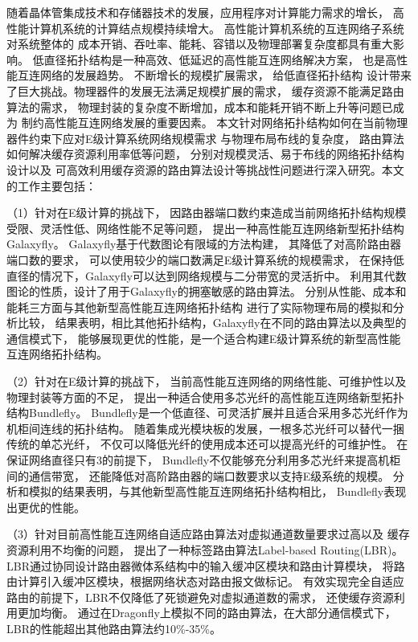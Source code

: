 \begin{cabstract}
  随着晶体管集成技术和存储器技术的发展，应用程序对计算能力需求的增长，
  高性能计算机系统的计算结点规模持续增大。
  高性能计算机系统的互连网络子系统对系统整体的
  成本开销、吞吐率、能耗、容错以及物理部署复杂度都具有重大影响。
  低直径拓扑结构是一种高效、低延迟的高性能互连网络解决方案，
  也是高性能互连网络的发展趋势。
  不断增长的规模扩展需求，
  给低直径拓扑结构
  设计带来了巨大挑战。物理器件的发展无法满足规模扩展的需求，
  缓存资源不能满足路由算法的需求，
  物理封装的复杂度不断增加，成本和能耗开销不断上升等问题已成为
  制约高性能互连网络发展的重要因素。
  本文针对网络拓扑结构如何在当前物理器件约束下应对E级计算系统网络规模需求
  与物理布局布线的复杂度，
  路由算法如何解决缓存资源利用率低等问题，
  分别对规模灵活、易于布线的网络拓扑结构设计以及
  可高效利用缓存资源的路由算法设计等挑战性问题进行深入研究。本文的工作主要包括：

  （1）针对在E级计算的挑战下，
  因路由器端口数约束造成当前网络拓扑结构规模受限、灵活性低、网络性能不足等问题，
  提出一种高性能互连网络新型拓扑结构Galaxyfly。
  Galaxyfly基于代数图论有限域的方法构建，
  其降低了对高阶路由器端口数的要求，
  可以使用较少的端口数满足E级计算系统的规模需求，
  在保持低直径的情况下，Galaxyfly可以达到网络规模与二分带宽的灵活折中。
  利用其代数图论的性质，设计了用于Galaxyfly的拥塞敏感的路由算法。
  分别从性能、成本和能耗三方面与其他新型高性能互连网络拓扑结构
  进行了实际物理布局的模拟和分析比较，
  结果表明，相比其他拓扑结构，Galaxyfly在不同的路由算法以及典型的通信模式下，
  能够展现更优的性能，是一个适合构建E级计算系统的新型高性能互连网络拓扑结构。

  （2）针对在E级计算的挑战下，
  当前高性能互连网络的网络性能、可维护性以及物理封装等方面的不足，
  提出一种适合使用多芯光纤的高性能互连网络新型拓扑结构Bundlefly。
  Bundlefly是一个低直径、可灵活扩展并且适合采用多芯光纤作为机柜间连线的拓扑结构。
  随着集成光模块板的发展，一根多芯光纤可以替代一捆传统的单芯光纤，
  不仅可以降低光纤的使用成本还可以提高光纤的可维护性。
  在保证网络直径只有3的前提下，
  Bundlefly不仅能够充分利用多芯光纤来提高机柜间的通信带宽，
  还能降低对高阶路由器的端口数要求以支持E级系统的规模。
  分析和模拟的结果表明，与其他新型高性能互连网络拓扑结构相比，
  Bundlefly表现出更优的性能。

  （3）针对目前高性能互连网络自适应路由算法对虚拟通道数量要求过高以及
  缓存资源利用不均衡的问题，
  提出了一种标签路由算法Label-based Routing(LBR)。
  LBR通过协同设计路由器微体系结构中的输入缓冲区模块和路由计算模块，
  将路由计算引入缓冲区模块，根据网络状态对路由报文做标记。
  有效实现完全自适应路由的前提下，LBR不仅降低了死锁避免对虚拟通道数的需求，
  还使缓存资源利用更加均衡。
  通过在Dragonfly上模拟不同的路由算法，在大部分通信模式下，
  LBR的性能超出其他路由算法约10\%-35\%。



\end{cabstract}

